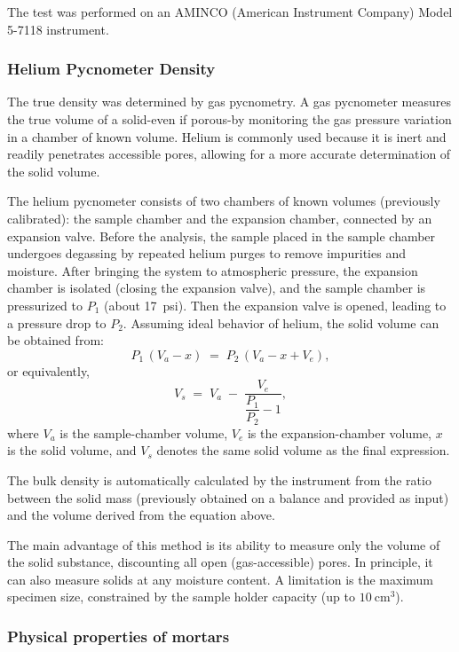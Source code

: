 The test was performed on an AMINCO (American Instrument Company) Model 5-7118 instrument.

\subsubsection{Helium Pycnometer Density}

The true density was determined by gas pycnometry.
A gas pycnometer measures the true volume of a solid-even if porous-by monitoring the gas pressure variation in a chamber of known volume.
Helium is commonly used because it is inert and readily penetrates accessible pores, allowing for a more accurate determination of the solid volume.

The helium pycnometer consists of two chambers of known volumes (previously calibrated): the sample chamber and the expansion chamber, connected by an expansion valve.
Before the analysis, the sample placed in the sample chamber undergoes degassing by repeated helium purges to remove impurities and moisture.
After bringing the system to atmospheric pressure, the expansion chamber is isolated (closing the expansion valve), and the sample chamber is pressurized to $P_1$ (about 17~psi).
Then the expansion valve is opened, leading to a pressure drop to $P_2$.
Assuming ideal behavior of helium, the solid volume can be obtained from:
\begin{equation}
P_1\,(V_a - x) \;=\; P_2\,(V_a - x + V_e),
\end{equation}
or equivalently,
\begin{equation}
V_s \;=\; V_a \;-\; \frac{V_e}{\dfrac{P_1}{P_2} - 1},
\end{equation}
where $V_a$ is the sample-chamber volume, $V_e$ is the expansion-chamber volume, $x$ is the solid volume, and $V_s$ denotes the same solid volume as the final expression.

The bulk density is automatically calculated by the instrument from the ratio between the solid mass (previously obtained on a balance and provided as input) and the volume derived from the equation above.

The main advantage of this method is its ability to measure only the volume of the solid substance, discounting all open (gas-accessible) pores.
In principle, it can also measure solids at any moisture content. A limitation is the maximum specimen size, constrained by the sample holder capacity (up to $10\ \mathrm{cm^3}$).

\subsubsection{Physical properties of mortars}
\label{sec:physical_properties_mortars}

